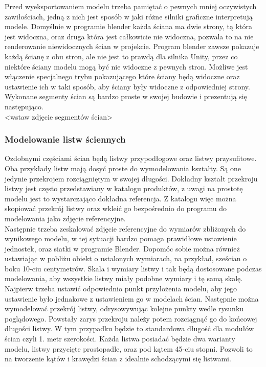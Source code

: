 \documentclass{article} %
\begin{document}
            Przed wyeksportowaniem modelu trzeba pamiętać o pewnych mniej oczywistych zawiłościach, jedną z nich jest sposób w jaki różne silniki graficzne interpretują modele. Domyślnie w programie blender każda ściana ma dwie strony, tą która jest widoczna, oraz druga która jest całkowicie nie widoczna, pozwala to na nie renderowanie niewidocznych ścian w projekcie. Program blender zawsze pokazuje każdą ścianę z obu stron, ale nie jest to prawdą dla silnika Unity, przez co niektóre ściany modelu mogą być nie widoczne z pewnych stron. Możliwe jest włączenie specjalnego trybu pokazującego które ściany będą widoczne oraz ustawienie ich w taki sposób, aby ściany były widoczne z odpowiedniej strony.
            \\
            
            Wykonane segmenty ścian są bardzo proste w swojej budowie i prezentują się następująco.
            \\
            <wstaw zdjęcie segmentów ścian>
            \\
            
        \subsubsection{Modelowanie listw ściennych}
            Ozdobnymi częściami ścian będą listwy przypodłogowe oraz listwy przysufitowe. Oba przykłady listw mają dosyć proste do wymodelowania kształty. Są one jedynie przekrojem rozciągniętym w swojej długości. Dokładny kształt przekroju listwy jest często przedstawiany w katalogu produktów, z uwagi na prostotę modelu jest to wystarczająco dokładna referencja. Z katalogu więc można skopiować przekrój listwy oraz wkleić go bezpośrednio do programu do modelowania jako zdjęcie referencyjne.
            \\
            
            Następnie trzeba zeskalować zdjęcie referencyjne do wymiarów zbliżonych do wynikowego modelu, w tej sytuacji bardzo pomaga prawidłowe ustawienie jednostek, oraz siatki w programie Blender. Dopomóc sobie można również ustawiając w pobliżu obiekt o ustalonych wymiarach, na przykład, sześcian o boku 10-ciu centymetrów. Skala i wymiary listwy i tak będą dostosowane podczas modelowania, aby wszystkie listwy miały podobne wymiary i tę samą skalę. 
            \\
            
            Najpierw trzeba ustawić odpowiednio punkt przyłożenia modelu, aby jego ustawienie było jednakowe z ustawieniem go w modelach ścian. Następnie można wymodelować przekrój listwy, odrysowywując kolejne punkty wedle rysunku poglądowego. Powstały zarys przekroju należy potem rozciągnąć go do końcowej długości listwy. W tym przypadku będzie to standardowa długość dla modułów ścian czyli 1. metr szerokości. Każda listwa posiadać będzie dwa warianty modelu, listwy przycięte prostopadle, oraz pod kątem 45-ciu stopni. Pozwoli to na tworzenie kątów i krawędzi ścian z idealnie schodzącymi się listwami.
            \\
            
\end{document}
